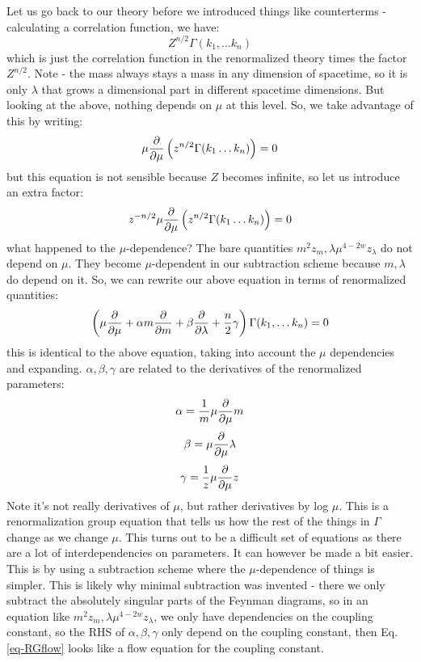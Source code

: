 Let us go back to our theory before we introduced things like counterterms - calculating a correlation function, we have:
\begin{equation}
    Z^{n/2}\Gamma(k_1, \ldots k_n)
\end{equation}
which is just the correlation function in the renormalized theory times the factor $Z^{n/2}$. Note - the mass always stays a mass in any dimension of spacetime, so it is only $\lambda$ that grows a dimensional part in different spacetime dimensions. But looking at the above, nothing depends on $\mu$ at this level. So, we take advantage of this by writing:
\begin{equation}
    \mu \frac{\partial }{\partial \mu}\left(z^{n/2}\Gamma(k_1 \ldots k_n)\right) = 0
\end{equation}
but this equation is not sensible because $Z$ becomes infinite, so let us introduce an extra factor:
\begin{equation}
    z^{-n/2}\mu\frac{\partial }{\partial \mu}\left(z^{n/2}\Gamma(k_1 \ldots k_n)\right) = 0
\end{equation}
what happened to the $\mu$-dependence? The bare quantities $m^2 z_m, \lambda \mu^{4-2w}z_\lambda$ do not depend on $\mu$. They become $\mu$-dependent in our subtraction scheme because $m, \lambda$ do depend on it. So, we can rewrite our above equation in terms of renormalized quantities:
\begin{equation}\label{eq-RGflow}
    \left(\mu\frac{\partial }{\partial \mu} + \alpha m \frac{\partial }{\partial m} + \beta \frac{\partial }{\partial \lambda} + \frac{n}{2}\gamma\right)\Gamma(k_1, \ldots k_n) = 0
\end{equation}
this is identical to the above equation, taking into account the $\mu$ dependencies and expanding. $\alpha, \beta, \gamma$ are related to the derivatives of the renormalized parameters:
\begin{equation}
    \alpha = \frac{1}{m}\mu \frac{\partial }{\partial \mu}m
\end{equation}
\begin{equation}
    \beta = \mu \frac{\partial }{\partial \mu}\lambda
\end{equation}
\begin{equation}
    \gamma = \frac{1}{z}\mu\frac{\partial }{\partial \mu}z
\end{equation}
Note it's not really derivatives of $\mu$, but rather derivatives by log $\mu$. This is a renormalization group equation that tells us how the rest of the things in $\Gamma$ change as we change $\mu$. This turns out to be a difficult set of equations as there are a lot of interdependencies on parameters. It can however be made a bit easier. This is by using a subtraction scheme where the $\mu$-dependence of things is simpler. This is likely why minimal subtraction was invented - there we only subtract the absolutely singular parts of the Feynman diagrams, so in an equation like $m^2 z_m, \lambda \mu^{4-2w}z_\lambda$, we only have dependencies on the coupling constant, so the RHS of $\alpha, \beta, \gamma$ only depend on the coupling constant, then Eq. \eqref{eq-RGflow} looks like a flow equation for the coupling constant.

